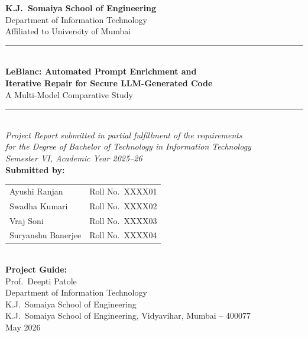 \documentclass[12pt,a4paper]{report}
\begin{document}
\onehalfspacing

\begin{titlepage}
\centering
\vspace*{0.2in}

{\Large\bfseries K.J.\ Somaiya School of Engineering}\\[0.08in]
{\large Department of Information Technology}\\[0.04in]
{\normalsize Affiliated to University of Mumbai}\\[0.35in]

\rule{\linewidth}{1.2pt}\\[0.18in]
{\LARGE\bfseries LeBlanc: Automated Prompt Enrichment and\\[0.1in]
Iterative Repair for Secure LLM-Generated Code}\\[0.12in]
{\large A Multi-Model Comparative Study}\\[0.18in]
\rule{\linewidth}{1.2pt}\\[0.28in]

{\normalsize\itshape Project Report submitted in partial fulfillment of the requirements\\[0.04in]
for the Degree of Bachelor of Technology in Information Technology\\[0.04in]
Semester VI, Academic Year 2025--26}\\[0.35in]

{\normalsize\bfseries Submitted by:}\\[0.12in]
\begin{tabular}{@{}ll@{}}
  Ayushi Ranjan       & Roll No.\ XXXX01 \\[0.04in]
  Swadha Kumari       & Roll No.\ XXXX02 \\[0.04in]
  Vraj Soni           & Roll No.\ XXXX03 \\[0.04in]
  Suryanshu Banerjee  & Roll No.\ XXXX04 \\
\end{tabular}\\[0.35in]

{\normalsize\bfseries Project Guide:}\\[0.08in]
{\normalsize Prof.\ Deepti Patole}\\[0.04in]
{\normalsize Department of Information Technology}\\[0.04in]
{\normalsize K.J.\ Somaiya School of Engineering}\\[0.35in]


{\normalsize K.J.\ Somaiya School of Engineering, Vidyavihar, Mumbai -- 400077}\\[0.06in]
{\normalsize May 2026}
\end{titlepage}
\end{document}

